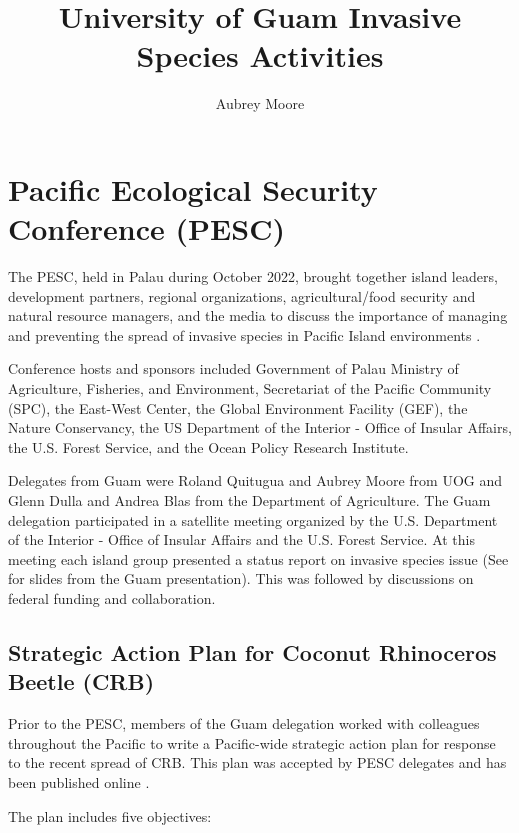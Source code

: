 \documentclass[twocolumn]{scrartcl}
\title{University of Guam Invasive Species Activities}
\author{Aubrey Moore}
\begin{document}
\maketitle

\section{Pacific Ecological Security Conference (PESC)}

The PESC, held in Palau during October 2022, brought together island leaders, development partners, regional organizations, agricultural/food security and natural resource managers, and the media to discuss the importance of managing and preventing the spread of invasive species in Pacific Island environments \cite{anonymousFirstPacificEcological2022}.

 Conference hosts and sponsors included Government of Palau Ministry of Agriculture, Fisheries, and Environment, Secretariat of the Pacific Community (SPC), the East-West Center, the Global Environment Facility (GEF), the Nature Conservancy, the US Department of the Interior - Office of Insular Affairs, the U.S. Forest Service, and the Ocean Policy Research Institute.

Delegates from Guam were Roland Quitugua and Aubrey Moore from UOG and Glenn Dulla and Andrea Blas from the Department of Agriculture. The Guam delegation participated in a satellite meeting organized by the U.S. Department of the Interior - Office of Insular Affairs and the U.S. Forest Service. At this meeting each island group presented a status report on invasive species issue (See \parencite{mooreOverviewInvasiveSpecies2022-10-06} for slides from the Guam presentation). This was followed by discussions on federal funding and collaboration.  

\subsection{Strategic Action Plan for Coconut Rhinoceros Beetle (CRB)}

Prior to the PESC, members of the Guam delegation worked with colleagues throughout the Pacific to write a Pacific-wide strategic action plan for response to the recent spread of CRB. This plan was accepted by PESC delegates and has been published online \cite{conferenceStrategicActionPlan2022}.

The plan includes five objectives:
\end{document}

